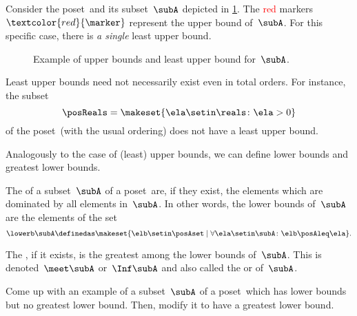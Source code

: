 \begin{example}
    Consider the poset~\posA and its subset~$\subA$ depicted in \cref{fig:upper_bound_example_bis}.
    The \textcolor{red}{red} markers~$\textcolor{red}{\marker}$ represent the upper bound of~$\subA$.
    For this specific case, there is \emph{a single} least upper bound.
\end{example}

\begin{figure}[h!]
    \caption{Example of upper bounds and least upper bound for~$\subA$.  \label{fig:upper_bound_example_bis}}
\end{figure}
\begin{example}
    Least upper bounds need not necessarily exist even in total orders.
    For instance, the subset
    \begin{equation}
        \posReals = \makeset{\ela \setin \reals \colon \ela>0}
    \end{equation}
    of the poset~\reals (with the usual ordering) does not have a least upper bound.
\end{example}

Analogously to the case of (least) upper bounds, we can define lower bounds and greatest lower bounds.

\begin{ctdefinition}
    \label{def:greatest-lower-bound}
    \label{def:lower-bounds}
    The  of a subset~$\subA$ of a poset~\posA are, if they exist, the elements which are dominated by all elements in~$\subA$.
    In other words, the lower bounds of~$\subA$ are the elements of the set
    \begin{equation}
        \lowerb \subA\definedas \makeset{ \elb \setin \posAset \mid \forall \ela \setin \subA \colon \elb \posAleq \ela }.
    \end{equation}
\end{ctdefinition}

\begin{ctdefinition}\label{def:infimum}
    The , if it exists, is the greatest among the lower bounds of~$\subA$.
    This is denoted~$\meet \subA$ or~$\Inf \subA$ and also called the  or  of~$\subA$.
\end{ctdefinition}

\begin{exercise}
    Come up with an example of a subset~$\subA$ of a poset~\posA which has lower bounds but no greatest lower bound.
    Then, modify it to have a greatest lower bound.
\end{exercise}

